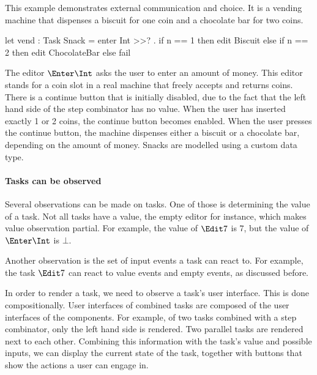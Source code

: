 \begin{example}
\label{Vending machine}

This example demonstrates external communication and choice.
It is a vending machine that dispenses a biscuit for one coin and a chocolate bar for two coins.
\begin{TASK}
  let vend : Task Snack = enter Int >>? \n. if n == 1 then edit Biscuit
    else if n == 2 then edit ChocolateBar else fail
\end{TASK}
The editor $\Enter \Int$ asks the user to enter an amount of money.
This editor stands for a coin slot in a real machine that freely accepts and returns coins.
There is a continue button that is initially disabled, due to the fact that the left hand side of the step combinator has no value.
When the user has inserted exactly 1 or 2 coins, the continue button becomes enabled.
When the user presses the continue button, the machine dispenses either a biscuit or a chocolate bar, depending on the amount of money.
Snacks are modelled using a custom data type.

\end{example}



\paragraph{Tasks can be observed}

Several observations can be made on tasks.
One of those is determining the value of a task.
Not all tasks have a value, the empty editor for instance, which makes value observation partial.
For example, the value of $\Edit 7$ is $7$, but the value of $\Enter \Int$ is $\bot$.

Another observation is the set of input events a task can react to.
For example, the task $\Edit 7$ can react to value events and empty events, as discussed before.

In order to render a task, we need to observe a task's user interface.
This is done compositionally.
User interfaces of combined tasks are composed of the user interfaces of the components.
For example, of two tasks combined with a step combinator, only the left hand side is rendered.
Two parallel tasks are rendered next to each other.
Combining this information with the task's value and possible inputs,
we can display the current state of the task,
together with buttons that show the actions a user can engage in.

